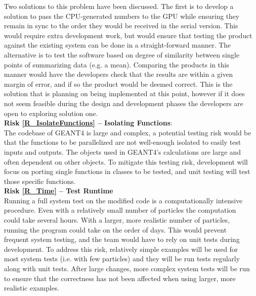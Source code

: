 \documentclass[12pt]{article}
\begin{document}
Two solutions to this problem have been discussed. The first is to develop a solution to pass the CPU-generated numbers to the GPU while ensuring they remain in sync to the order they would be received in the serial version. This would require extra development work, but would ensure that testing the product against the existing system can be done in a straight-forward manner. The alternative is to test the software based on degree of similarity between single points of summarizing data (e.g. a mean). Comparing the products in this manner would have the developers check that the results are within a given margin of error, and if so the product would be deemed correct. This is the solution that is planning on being implemented at this point, however if it does not seem feasible during the design and development phases the developers are open to exploring solution one.\\

\textbf{Risk \ref{R_IsolateFunctions} -- Isolating Functions}:\\
The codebase of GEANT4 is large and complex, a potential testing risk would be that the functions to be parallelized are not well-enough isolated to easily test inputs and outputs. The objects used in GEANT4's calculations are large and often dependent on other objects. To mitigate this testing risk, development will focus on porting single functions in classes to be tested, and unit testing will test those specific functions.\\

\textbf{Risk \ref{R_Time} -- Test Runtime}\\
Running a full system test on the modified code is a computationally intensive procedure. Even with a relatively small number of particles the computation could take several hours. With a larger, more realistic number of particles, running the program could take on the order of days. This would prevent frequent system testing, and the team would have to rely on unit tests during development. To address this risk, relatively simple examples will be used for most system tests (i.e. with few particles) and they will be run tests regularly along with unit tests. After large changes, more complex system tests will be run to ensure that the correctness has not been affected when using larger, more realistic examples.

\end{document}
